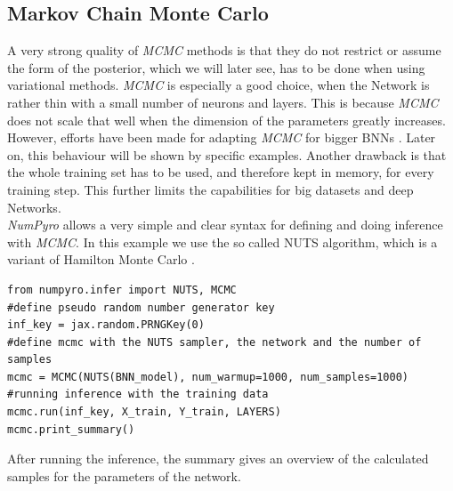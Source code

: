\documentclass{article}
\begin{document}
\subsection{Markov Chain Monte Carlo}
A very strong quality of \textit{MCMC} methods is that they do not restrict or assume the form of the posterior, which we will later see, has to be done when using variational methods. \textit{MCMC} is especially a good choice, when the Network is rather thin with a small number of neurons and layers. This is because \textit{MCMC} does not scale that well when the dimension of the parameters greatly increases. However, efforts have been made for adapting \textit{MCMC} for bigger BNNs \cite{murphy}. Later on, this behaviour will be shown by specific examples. Another drawback is that the whole training set has to be used, and therefore kept in memory, for every training step. This further limits the capabilities for big datasets and deep Networks.\\
\textit{NumPyro} allows a very simple and clear syntax for defining and doing inference with \textit{MCMC}. In this example we use the so called NUTS algorithm, which is a variant of Hamilton Monte Carlo \cite{Brooks_2011, hoffman2011nouturnsampleradaptivelysetting}.
\begin{lstlisting}
from numpyro.infer import NUTS, MCMC
#define pseudo random number generator key
inf_key = jax.random.PRNGKey(0)
#define mcmc with the NUTS sampler, the network and the number of samples
mcmc = MCMC(NUTS(BNN_model), num_warmup=1000, num_samples=1000)
#running inference with the training data 
mcmc.run(inf_key, X_train, Y_train, LAYERS)
mcmc.print_summary()
\end{lstlisting}
After running the inference, the summary gives an overview of the calculated samples for the parameters of the network.
\end{document}

